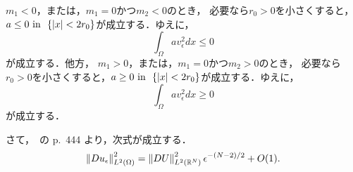 $m_1 < 0$，または，$m_1 = 0$かつ$m_2 < 0$のとき，
必要なら$r_0 > 0$を小さくすると，$a \leq 0 ~\text{in}~
~\{ \lvert x \rvert < 2r_0\}$が成立する．ゆえに，
\begin{equation}
 \int_\Omega av_\epsilon^2 dx \leq 0 \label{eq:intav^2_leq_0}
\end{equation}
が成立する．他方，
$m_1 > 0$，または，$m_1 = 0$かつ$m_2 > 0$のとき，
必要なら$r_0 > 0$を小さくすると，$a \geq 0 ~\text{in}~
~\{ \lvert x \rvert < 2r_0\}$が成立する．ゆえに，
\begin{equation}
 \int_\Omega av_\epsilon^2 dx \geq 0 \label{eq:intav^2_geq_0}
\end{equation}
が成立する．

さて，\cite{MR709644}~の p.~444 より，次式が成立する．
\begin{equation}
 \left\| Du_\epsilon \right\|_{L^2(\Omega)}^2 
  = \left\| DU \right\|_{L^2(\mathbb{R}^N)}^2 \epsilon^{-(N-2)/2} + O(1).
  \label{eq:Duepsilon}
\end{equation}

